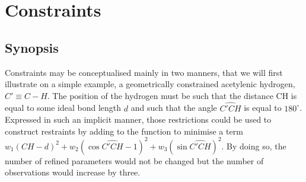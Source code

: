 \documentclass[pdf]{iucr}
\begin{document}
\section{Constraints}

\subsection{Synopsis}
\label{sec:constraints}

Constraints may be conceptualised mainly in two manners, that we will first illustrate on a simple example, a geometrically constrained acetylenic hydrogen, $C' \equiv C - H$. The position of the hydrogen must be such that the distance CH is equal to some ideal bond length $d$ and such that the angle $\widehat{C'CH}$ is equal to $180^\circ$. Expressed in such an implicit manner, those restrictions could be used to construct restraints by adding to the function to minimise a term $w_1 (CH - d)^2 + w_2 (\cos \widehat{C'CH} - 1)^2 + w_3 (\sin  \widehat{C'CH})^2$. By doing so, the number of refined parameters would not be changed but the number of observations would increase by three. 
\end{document}
